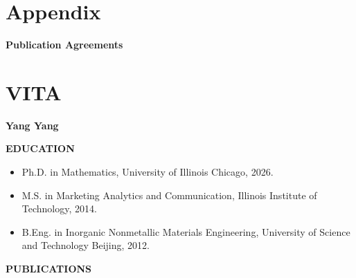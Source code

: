 \documentclass[12pt,reqno,oneside]{amsbook}
\theoremstyle{definition}
\theoremstyle{remark}
\begin{document}

\chapter*{Appendix}

\begin{center}
\textbf{Publication Agreements}
\end{center}






\cleardoublepage
\chapter*{VITA}

\noindent
\textbf{Yang Yang}

\vspace{0.5cm}

\noindent
\textbf{EDUCATION}

\begin{itemize}
    \item Ph.D. in Mathematics, University of Illinois Chicago, 2026.
    \item M.S. in Marketing Analytics and Communication, Illinois Institute of Technology, 2014.
    \item B.Eng. in Inorganic Nonmetallic Materials Engineering, University of Science and Technology Beijing, 2012.
\end{itemize}

\vspace{0.3cm}
\noindent
\textbf{PUBLICATIONS}
\end{document}
